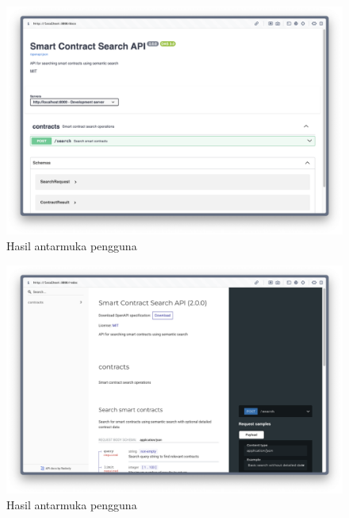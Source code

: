 \begin{figure}[ht]
	\centering
	\includegraphics[width=1\textwidth]{resources/appendix/hasil-api-2.png}
	\caption{Hasil antarmuka pengguna}
	\label{image:hasil-api-2}
\end{figure}

\begin{figure}[ht]
	\centering
	\includegraphics[width=1\textwidth]{resources/appendix/hasil-api-3.png}
	\caption{Hasil antarmuka pengguna}
	\label{image:hasil-api-3}
\end{figure}
